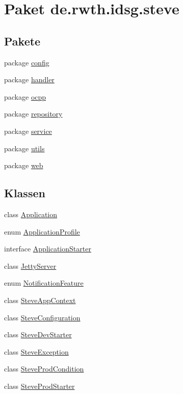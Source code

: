 \hypertarget{namespacede_1_1rwth_1_1idsg_1_1steve}{\section{Paket de.\+rwth.\+idsg.\+steve}
\label{namespacede_1_1rwth_1_1idsg_1_1steve}
}
\subsection*{Pakete}
\begin{DoxyCompactItemize}
\item 
package \hyperlink{namespacede_1_1rwth_1_1idsg_1_1steve_1_1config}{config}
\item 
package \hyperlink{namespacede_1_1rwth_1_1idsg_1_1steve_1_1handler}{handler}
\item 
package \hyperlink{namespacede_1_1rwth_1_1idsg_1_1steve_1_1ocpp}{ocpp}
\item 
package \hyperlink{namespacede_1_1rwth_1_1idsg_1_1steve_1_1repository}{repository}
\item 
package \hyperlink{namespacede_1_1rwth_1_1idsg_1_1steve_1_1service}{service}
\item 
package \hyperlink{namespacede_1_1rwth_1_1idsg_1_1steve_1_1utils}{utils}
\item 
package \hyperlink{namespacede_1_1rwth_1_1idsg_1_1steve_1_1web}{web}
\end{DoxyCompactItemize}
\subsection*{Klassen}
\begin{DoxyCompactItemize}
\item 
class \hyperlink{classde_1_1rwth_1_1idsg_1_1steve_1_1_application}{Application}
\item 
enum \hyperlink{enumde_1_1rwth_1_1idsg_1_1steve_1_1_application_profile}{Application\+Profile}
\item 
interface \hyperlink{interfacede_1_1rwth_1_1idsg_1_1steve_1_1_application_starter}{Application\+Starter}
\item 
class \hyperlink{classde_1_1rwth_1_1idsg_1_1steve_1_1_jetty_server}{Jetty\+Server}
\item 
enum \hyperlink{enumde_1_1rwth_1_1idsg_1_1steve_1_1_notification_feature}{Notification\+Feature}
\item 
class \hyperlink{classde_1_1rwth_1_1idsg_1_1steve_1_1_steve_app_context}{Steve\+App\+Context}
\item 
class \hyperlink{classde_1_1rwth_1_1idsg_1_1steve_1_1_steve_configuration}{Steve\+Configuration}
\item 
class \hyperlink{classde_1_1rwth_1_1idsg_1_1steve_1_1_steve_dev_starter}{Steve\+Dev\+Starter}
\item 
class \hyperlink{classde_1_1rwth_1_1idsg_1_1steve_1_1_steve_exception}{Steve\+Exception}
\item 
class \hyperlink{classde_1_1rwth_1_1idsg_1_1steve_1_1_steve_prod_condition}{Steve\+Prod\+Condition}
\item 
class \hyperlink{classde_1_1rwth_1_1idsg_1_1steve_1_1_steve_prod_starter}{Steve\+Prod\+Starter}
\end{DoxyCompactItemize}
